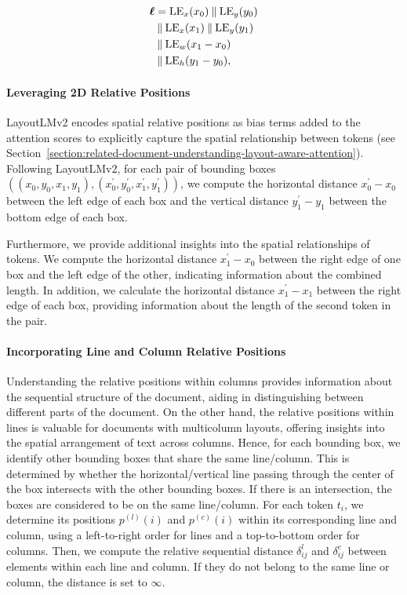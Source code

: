 \begin{equation}
  \begin{split}
      \boldsymbol{\ell} & = \text{LE}_x(x_0) \mathbin\Vert \text{LE}_y(y_0) \\
      & \mathbin\Vert \text{LE}_x(x_1) \mathbin\Vert \text{LE}_y(y_1) \\
      & \mathbin\Vert \text{LE}_w(x_1 - x_0) \\
      & \mathbin\Vert \text{LE}_h(y_1 - y_0), 
  \end{split}
\label{eq:layout-embeddings}
\end{equation}

\paragraph{Leveraging 2D Relative Positions} 

LayoutLMv2 encodes spatial relative positions as bias terms added to the attention scores to explicitly capture the spatial relationship between tokens (see Section~\ref{section:related-document-understanding-layout-aware-attention}). Following LayoutLMv2, for each pair of bounding boxes $((x_0, y_0, x_1, y_1), (x^{\prime}_0, y^{\prime}_0, x^{\prime}_1, y^{\prime}_1))$, we compute the horizontal distance $x^{\prime}_0 - x_0$ between the left edge of each box and the vertical distance $y^{\prime}_1 - y_1$ between the bottom edge of each box. 

Furthermore, we provide additional insights into the spatial relationships of tokens. We compute the horizontal distance $x^{\prime}_1 - x_0$ between the right edge of one box and the left edge of the other, indicating information about the combined length. In addition, we calculate the horizontal distance $x^{\prime}_1 - x_1$ between the right edge of each box, providing information about the length of the second token in the pair. 

\paragraph{Incorporating Line and Column Relative Positions}

Understanding the relative positions within columns provides information about the sequential structure of the document, aiding in distinguishing between different parts of the document. On the other hand, the relative positions within lines is valuable for documents with multicolumn layouts, offering insights into the spatial arrangement of text across columns. Hence, for each bounding box, we identify other bounding boxes that share the same line/column. This is determined by whether the horizontal/vertical line passing through the center of the box intersects with the other bounding boxes. If there is an intersection, the boxes are considered to be on the same line/column. For each token $t_i$, we determine its positions $p^{(l)}(i)$ and $p^{(c)}(i)$ within its corresponding line and column, using a left-to-right order for lines and a top-to-bottom order for columns. Then, we compute the relative sequential distance $\delta^{l}_{ij}$ and $\delta^{c}_{ij}$ between elements within each line and column. If they do not belong to the same line or column, the distance is set to $\infty$. 


